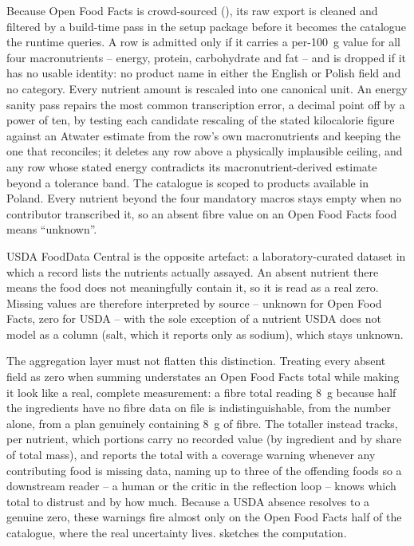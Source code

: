 Because Open Food Facts is crowd-sourced (), its raw export is cleaned and filtered by a build-time pass in the setup package before it becomes the catalogue the runtime queries. A row is admitted only if it carries a per-\qty{100}{\gram} value for all four macronutrients -- energy, protein, carbohydrate and fat -- and is dropped if it has no usable identity: no product name in either the English or Polish field and no category. Every nutrient amount is rescaled into one canonical unit. An energy sanity pass repairs the most common transcription error, a decimal point off by a power of ten, by testing each candidate rescaling of the stated kilocalorie figure against an Atwater estimate from the row's own macronutrients and keeping the one that reconciles; it deletes any row above a physically implausible ceiling, and any row whose stated energy contradicts its macronutrient-derived estimate beyond a tolerance band. The catalogue is scoped to products available in Poland. Every nutrient beyond the four mandatory macros stays empty when no contributor transcribed it, so an absent fibre value on an Open Food Facts food means ``unknown''.

USDA FoodData Central is the opposite artefact: a laboratory-curated dataset in which a record lists the nutrients actually assayed. An absent nutrient there means the food does not meaningfully contain it, so it is read as a real zero. Missing values are therefore interpreted by source -- unknown for Open Food Facts, zero for USDA -- with the sole exception of a nutrient USDA does not model as a column (salt, which it reports only as sodium), which stays unknown.

The aggregation layer must not flatten this distinction. Treating every absent field as zero when summing understates an Open Food Facts total while making it look like a real, complete measurement: a fibre total reading \qty{8}{\gram} because half the ingredients have no fibre data on file is indistinguishable, from the number alone, from a plan genuinely containing \qty{8}{\gram} of fibre. The totaller instead tracks, per nutrient, which portions carry no recorded value (by ingredient and by share of total mass), and reports the total with a coverage warning whenever any contributing food is missing data, naming up to three of the offending foods so a downstream reader -- a human or the critic in the reflection loop -- knows which total to distrust and by how much. Because a USDA absence resolves to a genuine zero, these warnings fire almost only on the Open Food Facts half of the catalogue, where the real uncertainty lives.  sketches the computation.

